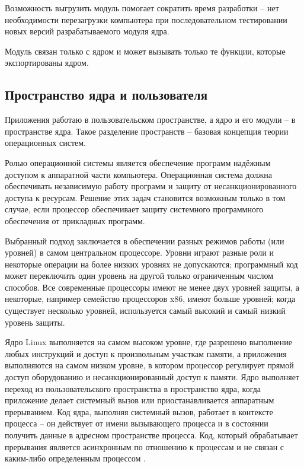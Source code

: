 Возможность выгрузить модуль помогает сократить время разработки -- нет необходимости перезагрузки компьютера при последовательном тестировании новых версий разрабатываемого модуля ядра.

Модуль связан только с ядром и может вызывать только те функции, которые экспортированы ядром.

\subsection{Пространство ядра и пользователя}

Приложения работаю в пользовательском пространстве, а ядро и его модули -- в пространстве ядра. Такое разделение пространств -- базовая концепция теории операционных систем.

Ролью операционной системы является обеспечение программ надёжным доступом к аппаратной части компьютера. Операционная система должна обеспечивать независимую работу программ и защиту от несанкционированного доступа к ресурсам. Решение этих задач становится возможным только в том случае, если процессор обеспечивает защиту системного программного обеспечения от прикладных программ.

Выбранный подход заключается в обеспечении разных режимов работы (или уровней) в самом центральном процессоре. Уровни играют разные роли и некоторые операции на более низких уровнях не допускаются; программный код может переключить один уровень на другой только ограниченным числом способов. Все современные процессоры имеют не менее двух уровней защиты, а некоторые, например семейство процессоров x86, имеют больше уровней; когда существует несколько уровней, используется самый высокий и самый низкий уровень защиты. 

Ядро Linux выполняется на самом высоком уровне, где разрешено выполнение любых инструкций и доступ к произвольным участкам памяти, а приложения выполняются на самом низком уровне, в котором процессор регулирует прямой доступ оборудованию и несанкционированный доступ к памяти. Ядро выполняет переход из пользовательского пространства в пространство ядра, когда приложение делает системный вызов или приостанавливается аппаратным прерыванием. Код ядра, выполняя системный вызов, работает в контексте процесса -- он действует от имени вызывающего процесса и в состоянии получить данные в адресном пространстве процесса. Код, который обрабатывает прерывания является асинхронным по отношению к процессам и не связан с каким-либо определенным процессом \cite{habr-profiling-linux}.

